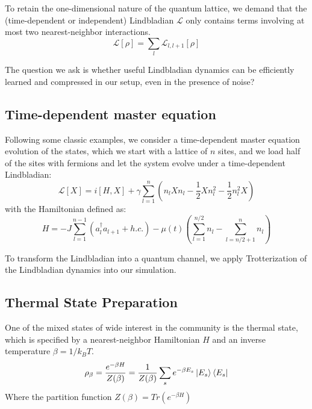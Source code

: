 \documentclass[%
 reprint,
superscriptaddress,
 amsmath,amssymb,
 aps,
]{revtex4-2}
\begin{document}
To retain the one-dimensional nature of the quantum lattice, we demand that the (time-dependent or independent) Lindbladian $\mathcal{L}$ only contains terms involving at most two nearest-neighbor interactions.
\begin{equation}
    \mathcal{L}[\rho]=\sum_l\mathcal{L}_{l, l+1}[\rho]
\end{equation}

The question we ask is whether useful Lindbladian dynamics can be efficiently learned and compressed in our setup, even in the presence of noise?

\subsection{Time-dependent master equation}

Following some classic examples, we consider a time-dependent master equation evolution of the states, which we start with a lattice of $n$ sites, and we load half of the sites with fermions and let the system evolve under a time-dependent Lindbladian:
\begin{equation}
    \mathcal{L}[X]=i[H, X]+\gamma \sum_{l=1}^n\left(n_l X n_l-\frac{1}{2} X n_l^2-\frac{1}{2} n_l^2 X\right)
\end{equation}
with the Hamiltonian defined as:
\begin{equation}
H = -J \sum_{l=1}^{n-1} \left( a_l^{\dagger} a_{l+1} + h.c. \right) - \mu(t) \left( \sum_{l=1}^{n/2} n_l - \sum_{l=n/2+1}^{n} n_l \right)
\end{equation}

To transform the Lindbladian into a quantum channel, we apply Trotterization of the Lindbladian dynamics into our simulation. 

\subsection{Thermal State Preparation}
One of the mixed states of wide interest in the community is the thermal state, which is specified by a nearest-neighbor Hamiltonian $H$ and an inverse temperature $\beta=1/k_BT$.
\begin{equation}
    \rho_\beta=\frac{e^{-\beta H}}{Z(\beta)}=\frac{1}{Z(\beta)}\sum_se^{-\beta E_s}\ket{E_s}\bra{E_s}
\end{equation}
Where the partition function $Z(\beta)=Tr(e^{-\beta H})$


\end{document}
